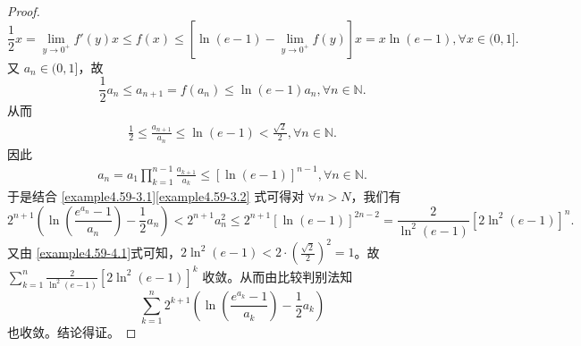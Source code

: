 \documentclass[../../main.tex]{subfiles}
\begin{document}
\begin{proof}
\[
\frac{1}{2} x = \lim_{y \to 0^+} f'(y) x \leqslant  f(x) \leqslant  [\ln(e - 1) - \lim_{y \to 0^+} f(y)] x = x \ln(e - 1),\forall x \in (0, 1].
\]
又 \(a_n \in (0, 1]\)，故
\[
\frac{1}{2} a_n \leqslant  a_{n + 1} = f(a_n) \leqslant  \ln(e - 1) a_n,\forall n \in \mathbb{N}.
\]
从而
\begin{align}
\frac{1}{2} \leqslant  \frac{a_{n + 1}}{a_n} \leqslant  \ln(e - 1) < \frac{\sqrt{2}}{2},\forall n \in \mathbb{N}. \label{example4.59-4.1} 
\end{align}
因此
\begin{align}
a_n = a_1 \prod_{k = 1}^{n - 1} \frac{a_{k + 1}}{a_k} \leqslant  [\ln(e - 1)]^{n - 1},\forall n \in \mathbb{N}. \label{example4.59-3.2}
\end{align}
于是结合 \eqref{example4.59-3.1}\eqref{example4.59-3.2} 式可得对 \(\forall n > N\)，我们有
\[
2^{n + 1}\left(\ln\left(\frac{e^{a_n} - 1}{a_n}\right) - \frac{1}{2} a_n\right) < 2^{n + 1} a_n^2 \leqslant  2^{n + 1}[\ln(e - 1)]^{2n - 2} = \frac{2}{\ln^2(e - 1)}[2\ln^2(e - 1)]^n.
\]
又由 \eqref{example4.59-4.1}式可知，\(2\ln^2(e - 1) < 2\cdot\left(\frac{\sqrt{2}}{2}\right)^2 = 1\)。故 \(\sum_{k = 1}^n \frac{2}{\ln^2(e - 1)}[2\ln^2(e - 1)]^k\) 收敛。从而由比较判别法知$$\sum_{k = 1}^n 2^{k + 1}\left(\ln\left(\frac{e^{a_k} - 1}{a_k}\right)- \frac{1}{2} a_k\right)$$也收敛。结论得证。

\end{proof}
\end{document}
